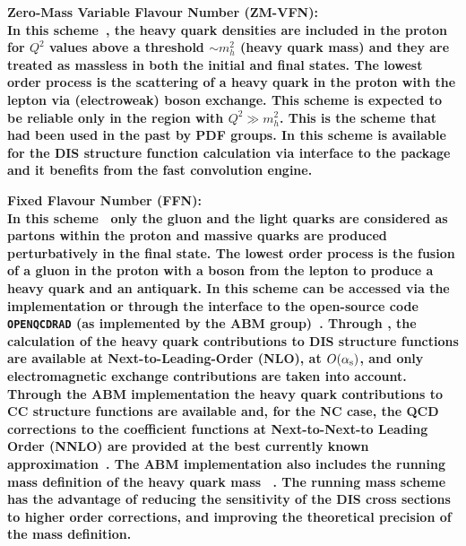 \begin{description}
\item \bf{Zero-Mass Variable Flavour Number (ZM-VFN):}\rm 
\\
In this scheme~\cite{ZMVFNpub}, the
heavy quark densities are included in the proton for $Q^2$ values above a threshold $\sim m_h^2$ (heavy quark mass)
and they 
are treated as massless in both the initial 
and final states. The lowest order process is the scattering
of a heavy quark in the proton with the lepton via (electroweak) boson exchange.
This scheme is expected to be reliable only in the region with $Q^2 \gg m_h^2$.
This is the scheme that had been used in the past by PDF groups.
In \fitter this scheme is available for the DIS structure function calculation 
via interface to the \qcdnum \cite{qcdnum} package and it benefits 
from the fast \qcdnum convolution engine.

\item \bf {Fixed Flavour Number (FFN):} \rm 
\\
In this scheme~\cite{Laenen:1992, Laenen:1993, Riem:1995}
 only the gluon and the light quarks are considered
as partons within the proton and massive 
quarks are produced perturbatively in the final state.
The lowest order process is the fusion of a gluon in the proton
with a boson from the lepton to produce a heavy quark and an antiquark.
In \fitter this scheme can be accessed via the 
\qcdnum implementation or through the interface to the open-source code \texttt{OPENQCDRAD} (as implemented by the ABM group)~\cite{openqcdrad:page}.
Through \qcdnum, the calculation of the heavy quark contributions to DIS structure functions
are available at Next-to-Leading-Order (NLO), at $O(\alpha_\mathrm{s})$, and only electromagnetic exchange contributions are taken into account.
Through the ABM implementation the heavy quark contributions to CC structure functions are available 
and, for the NC case, the QCD corrections to the coefficient functions at Next-to-Next-to Leading Order (NNLO)
are provided at the best currently known approximation~\cite{SMoch:npb864}.
The ABM implementation also includes the running mass definition of the heavy quark 
mass ~\cite{Alekhin:runm}.
The running mass scheme has the advantage of reducing the sensitivity of the DIS cross sections to
higher order corrections, and improving the theoretical precision of the mass definition. 



\end{description}
